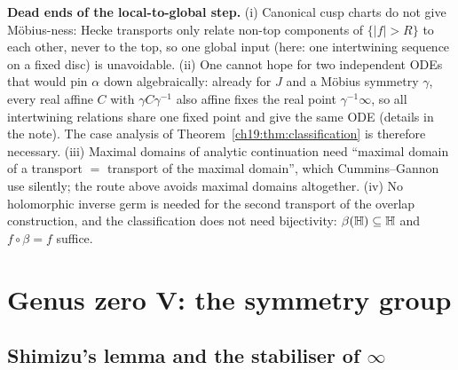 \begin{warning}
\textbf{Dead ends of the local-to-global step.}  (i) Canonical cusp charts do not give
M\"obius-ness: Hecke transports only relate non-top components of $\{|f|>R\}$ to each other, never to the top, so one global input
(here: one intertwining sequence on a fixed disc) is unavoidable.  (ii) One cannot hope for two independent ODEs that would pin $\alpha$ down algebraically: already for $J$ and a M\"obius
symmetry $\gamma$, every real affine $C$ with $\gamma C\gamma^{-1}$ also affine fixes the real point $\gamma^{-1}\infty$, so all intertwining
relations share one fixed point and give the same ODE (details in the note).  The case analysis of
Theorem~\ref{ch19:thm:classification} is therefore necessary.  (iii) Maximal domains of analytic continuation need ``maximal
domain of a transport $=$ transport of the maximal domain'', which Cummins--Gannon use silently; the route above avoids maximal
domains altogether.  (iv) No holomorphic inverse germ is needed for the second transport of the overlap construction, and the
classification does not need bijectivity: $\beta(\mathbb{H})\subseteq\mathbb{H}$ and $f\circ\beta=f$ suffice.
\end{warning}

\section{Genus zero V: the symmetry group}\label{ch19:sec:group}

\subsection{Shimizu's lemma and the stabiliser of \texorpdfstring{$\infty$}{infinity}}


